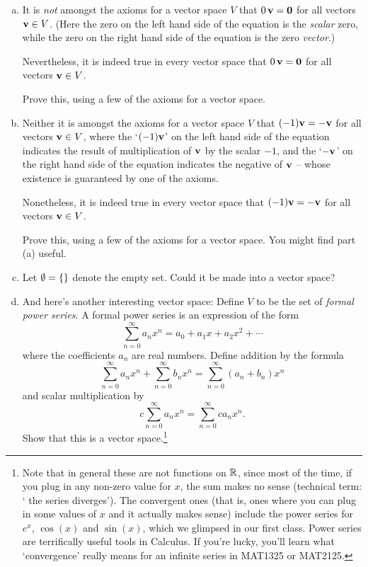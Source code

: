 \begin{prob}
\begin{enumerate}[a)]
\item  It is {\it not} amongst the axioms for a vector space $V$ that $0 \,\mathbf{v} =\mathbf{0}$ for all vectors $\mathbf{v}\in V$. (Here the zero on the left hand side of the equation is the {\it scalar} zero, while the zero on the right hand side of the equation is the zero {\it vector}.)

Nevertheless, it is indeed true in every vector space that $0\, \mathbf{v} =\mathbf{0}$ for all vectors $\mathbf{v}\in V$. 

Prove this, using a few of the axioms for a vector space. \medskip 
%

\item   Neither it is   amongst the axioms for a vector space $V$ that $(-1)\mathbf{v} =-\mathbf{v}$ for all vectors $\mathbf{v}\in V$, where the `$(-1)\mathbf{v}$' on the left hand side of the equation indicates the result of multiplication of $\mathbf{v}$ by the scalar $-1$, and the  `$ -\mathbf{v}$' on the right hand side of the equation indicates the negative of $\mathbf{v}$ -- whose existence is guaranteed by one of the axioms.

Nonetheless, it is indeed true in every vector space that $(-1) \mathbf{v} =-\mathbf{v}$ for all vectors $\mathbf{v}\in V$. 
 
Prove this, using a few of the axioms for a vector space.  You might find part (a) useful.\medskip 
%
 \item Let  $\emptyset=\{ \}$ denote the empty set. Could it be made into a vector space?
\medskip 
%
\item And here's another interesting vector space:  Define
$V$ to be the set of \emph{formal power series}.
A formal power series is an expression of the form
$$
\sum_{n=0}^\infty a_nx^n = a_0 + a_1x+ a_2x^2 + \cdots
$$
where the coefficients $a_n$ are real numbers.  Define
addition by the formula
$$
\sum_{n=0}^\infty a_nx^n + \sum_{n=0}^\infty b_n x^n =  \sum_{n=0}^\infty (a_n+b_n) x^n
$$    
and scalar multiplication by
$$
c  \sum_{n=0}^\infty a_n x^n =  \sum_{n=0}^\infty ca_n x^n.
$$
Show that this is a vector space.\footnote{Note that in general these
are not functions on $\mathbb{R}$, since most of the time, if you
plug in any non-zero value for $x$, the sum makes no sense
(technical term: ` the series diverges').  The convergent ones (that is,
ones where you can plug in  some values of $x$ and it actually makes sense) include the power series for $e^x$, $\cos(x)$
and $\sin(x)$, which we glimpsed in our first class.  Power
series are terrifically useful tools in Calculus. If you're lucky, you'll learn what `convergence' really means for an infinite series in MAT1325 or MAT2125.}
\end{enumerate}
\end{prob}